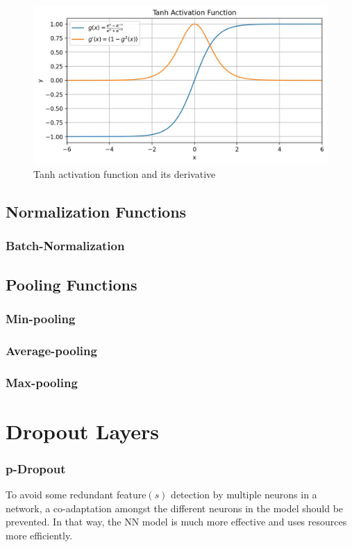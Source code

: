 \begin{figure}[H]
    \centering
    \includegraphics[width=0.75\linewidth]{ANN/images/tanh}
    \caption{Tanh activation function and its derivative}\label{fig:tanh_af}
\end{figure}


\subsection{Normalization Functions}
\subsubsection{Batch-Normalization}

\subsection{Pooling Functions}
\subsubsection{Min-pooling}
\subsubsection{Average-pooling}
\subsubsection{Max-pooling}

\section{Dropout Layers}
\subsubsection{p-Dropout}
To avoid some redundant feature\((s)\) detection by multiple neurons in a network,
a co-adaptation amongst the different neurons in the model should be prevented.
In that way, the NN model is much more effective and uses resources more efficiently.

